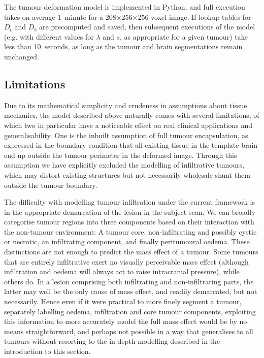 \documentclass[12pt,phd,a4paper,twoside]{ucl_thesis}
\newcommand{\x}{\nobreak\hspace{.1em minus .045em}$\times$\nobreak\hspace{.1em minus .045em}}
\begin{document}
The tumour deformation model is implemented in Python, and full execution takes on average 1~minute for a 208\x{}256\x{}256 voxel image.
If lookup tables for $ D_t$ and $D_b$ are precomputed and saved, then subsequent executions of the model (e.g. with different values for $\lambda$ and $s$, as appropriate for a given tumour) take less than 10~seconds, as long as the tumour and brain segmentations remain unchanged.

\subsection{Limitations}

Due to its mathematical simplicity and crudeness in assumptions about tissue mechanics, the model described above naturally comes with several limitations, of which two in particular have a noticeable effect on real clinical applications and generalisability.
One is the inbuilt assumption of full tumour encapsulation, as expressed in the boundary condition that all existing tissue in the template brain end up outside the tumour perimeter in the deformed image.
Through this assumption we have explicitly excluded the modelling of infiltrative tumours, which may distort existing structures but not necessarily wholesale shunt them outside the tumour boundary.

The difficulty with modelling tumour infiltration under the current framework is in the appropriate demarcation of the lesion in the subject scan.
We can broadly categorise tumour regions into three components based on their interaction with the non-tumour environment:
A tumour core, non-infiltrating and possibly cystic or necrotic, an infiltrating component, and finally peritumoural oedema.
These distinctions are not enough to predict the mass effect of a tumour.
Some tumours that are entirely infiltrative exert no visually perceivable mass effect (although infiltration and oedema will always act to raise intracranial pressure), while others do.
In a lesion comprising both infiltrating and non-infiltrating parts, the latter may well be the only cause of mass effect, and readily demarcated, but not necessarily.
Hence even if it were practical to more finely segment a tumour, separately labelling oedema, infiltration and core tumour components, exploiting this information to more accurately model the full mass effect would be by no means straightforward, and perhaps not possible in a way that generalises to all tumours without resorting to the in-depth modelling described in the introduction to this section.
\end{document}

